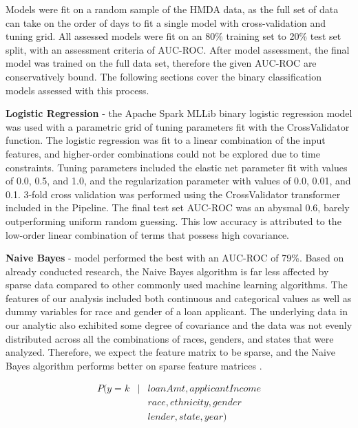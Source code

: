 \documentclass[conference,compsoc]{IEEEtran}
\begin{document}
Models were fit on a random sample of the HMDA data, as the full set of data can take on the order of days to fit a single model with cross-validation and tuning grid. All assessed models were fit on an 80\% training set to 20\% test set split, with an assessment criteria of AUC-ROC. After model assessment, the final model was trained on the full data set, therefore the given AUC-ROC are conservatively bound. The following sections cover the binary classification models assessed with this process.

\textbf{Logistic Regression} - the Apache Spark MLLib binary logistic regression model was used with a parametric grid of tuning parameters fit with the CrossValidator function. The logistic regression was fit to a linear combination of the input features, and higher-order combinations could not be explored due to time constraints. Tuning parameters included the elastic net parameter fit with values of 0.0, 0.5, and 1.0, and the regularization parameter with values of 0.0, 0.01, and 0.1. 3-fold cross validation was performed using the CrossValidator transformer included in the Pipeline. The final test set AUC-ROC was an abysmal 0.6, barely outperforming uniform random guessing. This low accuracy is attributed to the low-order linear combination of terms that possess high covariance. 

\textbf{Naive Bayes} - model performed the best with an AUC-ROC of 79\%. Based on already conducted research, the Naive Bayes algorithm is far less affected by sparse data compared to other commonly used machine learning algorithms.  The features of our analysis included both continuous and categorical values as well as dummy variables for race and gender of a loan applicant.  The underlying data in our analytic also exhibited some degree of covariance and the data was not evenly distributed across all the combinations of races, genders, and states that were analyzed.  Therefore, we expect the feature matrix to be sparse, and the Naive Bayes algorithm performs better on sparse feature matrices \cite{naiveBayes}.  

\begin{eqnarray*}
  P(y=k & | & loanAmt, applicantIncome \\
& & race, ethnicity, gender  \\
& & lender, state, year)
\end{eqnarray*}
\end{document}
